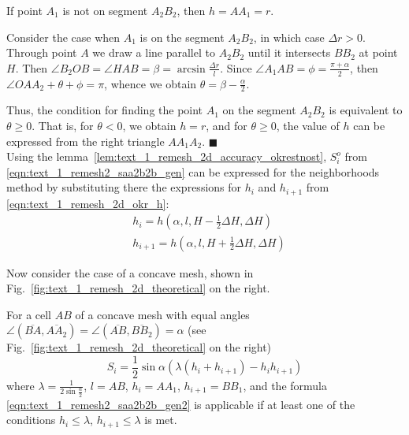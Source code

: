 \documentclass[
11pt,%
tightenlines,%
twoside,%
onecolumn,%
nofloats,%
nobibnotes,%
nofootinbib,%
superscriptaddress,%
noshowpacs,%
centertags]%
{revtex4}
\begin{document}
If point $A_1$ is not on segment $A_2B_2$, then $h = AA_1 = r$.

Consider the case when $A_1$ is on the segment $A_2B_2$, in which case $\Delta r > 0$.
Through point $A$ we draw a line parallel to $A_2B_2$ until it intersects $BB_2$ at point $H$.
Then $\angle B_2OB = \angle HAB = \beta = \arcsin \frac{\Delta r}{l}$.
Since $\angle A_1AB = \phi = \frac{\pi + \alpha}{2}$, then $\angle OAA_2 + \theta + \phi = \pi$, whence we obtain $\theta = \beta - \frac{\alpha}{2}$.

Thus, the condition for finding the point $A_1$ on the segment $A_2B_2$ is equivalent to $\theta \ge 0$.
That is, for $\theta < 0$, we obtain $h = r$, and for $\theta \ge 0$, the value of $h$ can be expressed from the right triangle $AA_1A_2$.
$\blacksquare$\\

Using the lemma~\ref{lem:text_1_remesh_2d_accuracy_okrestnost}, $S_i^o$ from \eqref{eqn:text_1_remesh2_saa2b2b_gen} can be expressed for the neighborhoods method by substituting there the expressions for $h_i$ and $h_{i + 1}$ from \eqref{eqn:text_1_remesh_2d_okr_h}:
\begin{equation}
	\begin{aligned}
	& h_i = h \left( \alpha, l, H - \frac{1}{2}\Delta H, \Delta H \right) \\
	& h_{i + 1} = h \left( \alpha, l, H + \frac{1}{2}\Delta H, \Delta H \right)
	\end{aligned}
\end{equation}

Now consider the case of a concave mesh, shown in Fig.~\ref{fig:text_1_remesh_2d_theoretical} on the right.

\begin{lemma}
For a cell $AB$ of a concave mesh with equal angles $\angle (\overline{BA}, \overline{AA_2}) = \angle (\overline{AB}, \overline{BB_2}) = \alpha$ (see Fig.~\ref{fig:text_1_remesh_2d_theoretical} on the right)
\begin{equation}\label{eqn:text_1_remesh2_saa2b2b_gen2}
S_i = \frac{1}{2} \sin \alpha \left( \lambda(h_i + h_{i+1}) - h_ih_{i+1} \right)
\end{equation}
where $\lambda = \frac{1}{2 \sin \frac{\alpha}{2}}$, $l = AB$, $h_i = AA_1$, $h_{i + 1} = BB_1$, and the formula \eqref{eqn:text_1_remesh2_saa2b2b_gen2} is applicable if at least one of the conditions $h_i \le \lambda$, $h_{i+1} \le \lambda$ is met.
\end{lemma}
\end{document}
